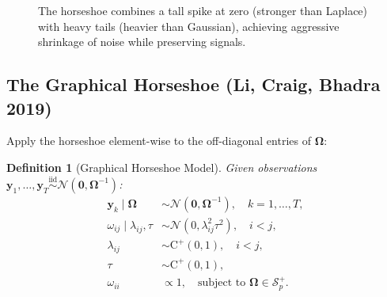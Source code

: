 \documentclass[11pt,a4paper]{article}
\newtheorem{definition}[theorem]{Definition}
\newcommand{\Normal}{\mathcal{N}}
\newcommand{\HalfCauchy}{\mathrm{C}^{+}}
\newcommand{\Spp}{\mathcal{S}^{+}_p}
\newcommand{\bOmega}{\bm{\Omega}}
\begin{document}
\begin{figure}[h]
\centering
{}
\caption{The horseshoe combines a tall spike at zero (stronger than Laplace) with heavy tails (heavier than Gaussian), achieving aggressive shrinkage of noise while preserving signals.}
\label{fig:prior-comparison}
\end{figure}

\subsection{The Graphical Horseshoe (Li, Craig, Bhadra 2019)}

Apply the horseshoe element-wise to the off-diagonal entries of $\bOmega$:

\begin{definition}[Graphical Horseshoe Model]\label{def:graph-horseshoe}
Given observations $\bm{y}_1,\ldots,\bm{y}_T \stackrel{\text{iid}}{\sim}\Normal(\bm{0},\bOmega^{-1})$:
\begin{align}
  \bm{y}_k \mid \bOmega &\sim \Normal(\bm{0}, \bOmega^{-1}), \quad k=1,\ldots,T, \label{eq:gh-lik}\\
  \omega_{ij} \mid \lambda_{ij}, \tau &\sim \Normal(0, \lambda_{ij}^2\tau^2), \quad i < j, \label{eq:gh-offdiag}\\
  \lambda_{ij} &\sim \HalfCauchy(0,1), \quad i < j, \label{eq:gh-local}\\
  \tau &\sim \HalfCauchy(0,1), \label{eq:gh-global}\\
  \omega_{ii} &\propto 1, \quad \text{subject to } \bOmega \in \Spp. \label{eq:gh-diag}
\end{align}
\end{definition}
\end{document}
